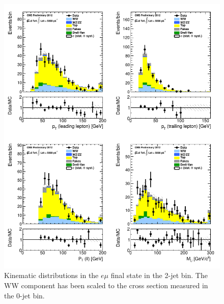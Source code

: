 \begin{figure}[!hbtp]
\centering
\includegraphics[width=1\textwidth]{figures/ww_analysis20_0_ALL_em_2j.pdf} %
\caption{Kinematic distributions in the $e\mu$ final state in the 2-jet bin.
The WW component has been scaled to the cross section measured in the 0-jet bin.}
\label{fig:xs_kinematics_em_2j}
\end{figure}
